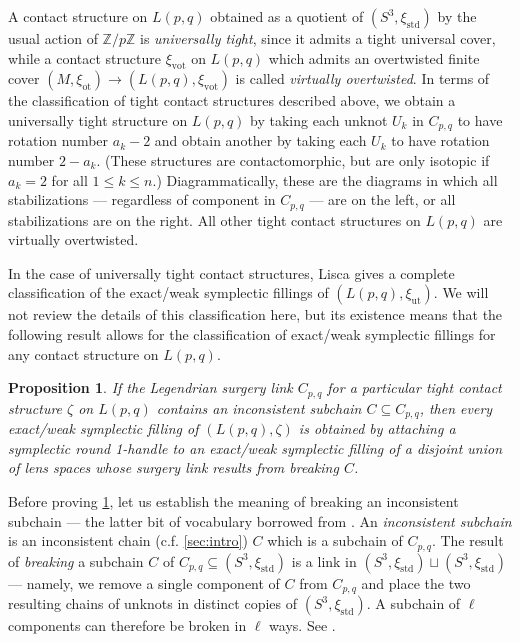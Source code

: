 \documentclass[11pt]{amsart}
\numberwithin{equation}{section}
\theoremstyle{plain}
\newtheorem{prop}[equation]{Proposition}%
\theoremstyle{definition}
\theoremstyle{remark}\newtheorem{rem}[equation]{Remark}%
\theoremstyle{remark}\newtheorem{obs}[equation]{Observation}%
\begin{document}
A contact structure on $L(p,q)$ obtained as a quotient of $(S^3,\xi_{\mathrm{std}})$ by the usual action of $\mathbb{Z}/p\mathbb{Z}$ is \emph{universally tight}, since it admits a tight universal cover, while a contact structure $\xi_{\mathrm{vot}}$ on $L(p,q)$ which admits an overtwisted finite cover $(M,\xi_{\mathrm{ot}})\to(L(p,q),\xi_{\mathrm{vot}})$ is called \emph{virtually overtwisted}.  In terms of the classification of tight contact structures described above, we obtain a universally tight structure on $L(p,q)$ by taking each unknot $U_k$ in $C_{p,q}$ to have rotation number $a_k-2$ and obtain another by taking each $U_k$ to have rotation number $2-a_k$.  (These structures are contactomorphic, but are only isotopic if $a_k=2$ for all $1\leq k\leq n$.)  Diagrammatically, these are the diagrams in which all stabilizations --- regardless of component in $C_{p,q}$ --- are on the left, or all stabilizations are on the right.  All other tight contact structures on $L(p,q)$ are virtually overtwisted.

In the case of universally tight contact structures, Lisca \cite{lisca2008symplectic} gives a complete classification of the exact/weak symplectic fillings of $(L(p,q),\xi_{\mathrm{ut}})$.  We will not review the details of this classification here, but its existence means that the following result allows for the classification of exact/weak symplectic fillings for any contact structure on $L(p,q)$.

\begin{prop}\label{prop:inconsistent-subchain}
If the Legendrian surgery link $C_{p,q}$ for a particular tight contact structure $\zeta$ on $L(p,q)$ contains an \emph{inconsistent subchain} $C\subseteq C_{p,q}$, then every exact/weak symplectic filling of $(L(p,q),\zeta)$ is obtained by attaching a symplectic round 1-handle to an exact/weak symplectic filling of a disjoint union of lens spaces whose surgery link results from \emph{breaking} $C$.
\end{prop}

Before proving \cref{prop:inconsistent-subchain}, let us establish the meaning of breaking an inconsistent subchain --- the latter bit of vocabulary borrowed from \cite{etnyre2021symplectic}.  An \emph{inconsistent subchain} is an inconsistent chain (c.f. \cref{sec:intro}) $C$ which is a subchain of $C_{p,q}$.  The result of \emph{breaking} a subchain $C$ of $C_{p,q}\subseteq (S^3,\xi_{\mathrm{std}})$ is a link in $(S^3,\xi_{\mathrm{std}})\sqcup(S^3,\xi_{\mathrm{std}})$ --- namely, we remove a single component of $C$ from $C_{p,q}$ and place the two resulting chains of unknots in distinct copies of $(S^3,\xi_{\mathrm{std}})$.  A subchain of $\ell$ components can therefore be broken in $\ell$ ways.  See .
\end{document}
